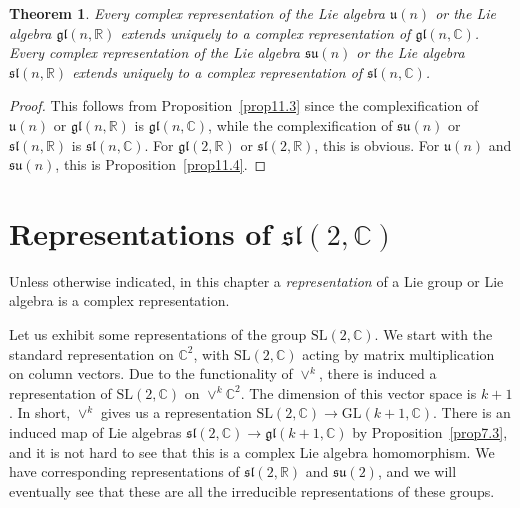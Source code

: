 \documentclass[12pt,reqno]{book}%
\newtheorem{theorem}{Theorem}[chapter]
\theoremstyle{definition}
\theoremstyle{remark}
\theoremstyle{theorem}
\theoremstyle{remark}
\begin{document}
\begin{theorem}\label{thm11.1}%
    Every complex representation of the Lie algebra $\mathfrak{u}(n)$ or the Lie algebra $\mathfrak{gl}(n, \mathbb{R})$ extends uniquely to a complex representation of $\mathfrak{gl}(n, \mathbb{C})$.
    Every complex representation of the Lie algebra $\mathfrak{su}(n)$ or the Lie algebra $\mathfrak{sl}(n, \mathbb{R})$ extends uniquely to a complex representation of $\mathfrak{sl}(n, \mathbb{C})$.
\end{theorem}%
\begin{proof}%
    This follows from Proposition~\ref{prop11.3} since the complexification of $\mathfrak{u}(n)$ or $\mathfrak{gl}(n, \mathbb{R})$ is $\mathfrak{gl}(n, \mathbb{C})$, while the complexification of $\mathfrak{su}(n)$ or $\mathfrak{sl}(n, \mathbb{R})$ is $\mathfrak{sl}(n, \mathbb{C})$.
    For $\mathfrak{gl}(2, \mathbb{R})$ or $\mathfrak{sl}(2, \mathbb{R})$, this is obvious.
    For $\mathfrak{u}(n)$ and $\mathfrak{su}(n)$, this is Proposition~\ref{prop11.4}.
\end{proof}%

\chapter{Representations of $\mathfrak{sl}(2, \mathbb{C})$}\label{}%
Unless otherwise indicated, in this chapter a \emph{representation} of a Lie group or Lie algebra is a complex representation.

Let us exhibit some representations of the group $\mathrm{SL}(2, \mathbb{C})$.
We start with the standard representation on $\mathbb{C}^2$, with $\mathrm{SL}(2, \mathbb{C})$ acting by matrix multiplication on column vectors.
Due to the functionality of $\vee^k$, there is induced a representation of $\mathrm{SL}(2, \mathbb{C})$ on $\vee^k\mathbb{C}^2$.
The dimension of this vector space is $k +  1$.
In short, $\vee^k$ gives us a representation $\mathrm{SL}(2, \mathbb{C}) \to \mathrm{GL}(k + 1, \mathbb{C})$.
There is an induced map of Lie algebras $\mathfrak{sl}(2, \mathbb{C}) \to \mathfrak{gl}(k + 1, \mathbb{C})$ by Proposition~\ref{prop7.3}, and it is not hard to see that this is a complex Lie algebra homomorphism.
We have corresponding representations of $\mathfrak{sl}(2, \mathbb{R})$ and $\mathfrak{su}(2)$, and we will eventually see that these are all the irreducible representations of these groups.
\end{document}
